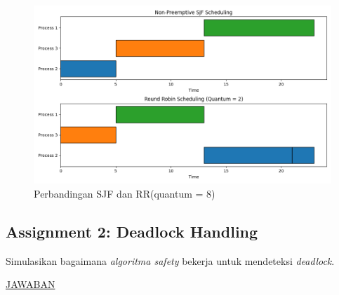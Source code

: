 \documentclass[12pt]{article}
\begin{document}
\begin{figure}[H]
    \centering
    \includegraphics[width=1\linewidth]{asset/412.png}
    \caption{Perbandingan SJF dan RR(quantum = 8)}
\end{figure}


\subsection{Assignment 2: Deadlock Handling}
\hspace*{1cm} Simulasikan bagaimana \textit{algoritma safety} bekerja untuk mendeteksi \textit{deadlock}.
\newline
\newline

\begin{center}
    \underline{JAWABAN}
\end{center}
\end{document}
